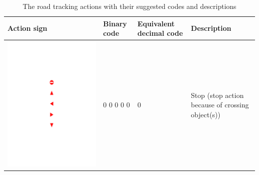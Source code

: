 \documentclass{svproc}
\begin{document}
\begin{table}[!h]
	\centering
	\caption{The road tracking actions with their suggested codes and descriptions}
	\label{Table:Signs_codes}
	\begin{tabular}{|C{3cm}|C{1.5cm}|C{3cm}|C{4cm}|}
		\hline
		\textbf{Action sign} & \textbf{Binary code} & \textbf{Equivalent decimal code} & \textbf{Description} \\ \hline
		\begin{minipage}{.075\textwidth}\includegraphics[scale=.5,trim=9.1cm 18.5cm 9.5cm 8cm,clip]{signs.pdf}\end{minipage}	& 0 0 0 0 0 & 0 & Stop (stop action because of crossing object(s)) \\ \hline

\end{tabular}
\end{table}
\end{document}
